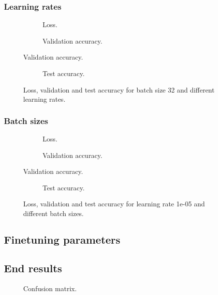\subsubsection{Learning rates}

\begin{figure}
	\begin{subfigure}[b]{\textwidth}
		
		\caption{Loss.}
	\end{subfigure}

	\begin{subfigure}[b]{\textwidth}
		
		\caption{Validation accuracy.}
	\end{subfigure}
\end{figure}

\begin{figure}
	\ContinuedFloat
	\begin{subfigure}[b]{\textwidth}
		
		\caption{Test accuracy.}
	\end{subfigure}
	\caption{Loss, validation and test accuracy for batch size 32 and different learning rates.}
\end{figure}


\subsubsection{Batch sizes}

\begin{figure}
	\begin{subfigure}[b]{\textwidth}
		
		\caption{Loss.}
	\end{subfigure}

	\begin{subfigure}[b]{\textwidth}
		
		\caption{Validation accuracy.}
	\end{subfigure}
\end{figure}

\begin{figure}
	\ContinuedFloat
	\begin{subfigure}[b]{\textwidth}
		
		\caption{Test accuracy.}
	\end{subfigure}
	\caption{Loss, validation and test accuracy for learning rate 1e-05 and different batch sizes.}
\end{figure}


\subsection{Finetuning parameters}

\subsection{End results}

\begin{figure}
	
	\caption{Confusion matrix.}
\end{figure}
